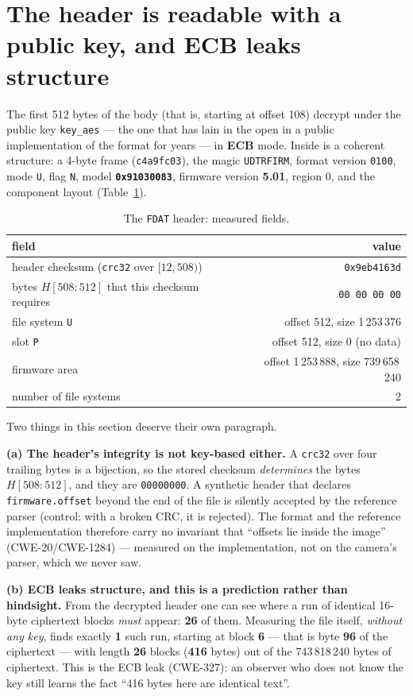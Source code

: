 \documentclass[12pt]{article}
\newcommand{\code}[1]{\texttt{\small #1}}
\newcommand{\hx}[1]{\texttt{\footnotesize #1}}
\begin{document}
\section{The header is readable with a public key, and ECB leaks structure}
\label{sec:header}

The first 512 bytes of the body (that is, starting at offset 108) decrypt under the public
key \code{key\_aes} --- the one that has lain in the open in a public implementation of the
format for years --- in \textbf{ECB} mode. Inside is a coherent structure: a 4-byte frame
(\hx{c4a9fc03}), the magic \code{UDTRFIRM}, format version \code{0100}, mode \code{U}, flag
\code{N}, model \textbf{\code{0x91030083}}, firmware version \textbf{5.01}, region 0, and the
component layout (Table~\ref{tab:header}).

\begin{table}[htbp]\centering
\small
\caption{The \code{FDAT} header: measured fields.}
\label{tab:header}
\begin{tabular}{lr}
\toprule
field & value \\
\midrule
header checksum (\code{crc32} over $[12,508)$) & \hx{0x9eb4163d} \\
bytes $H[508{:}512]$ that this checksum requires & \hx{00 00 00 00} \\
file system \code{U} & offset 512, size 1\,253\,376 \\
slot \code{P} & offset 512, size 0 (no data) \\
firmware area & offset 1\,253\,888, size 739\,658\,240 \\
number of file systems & 2 \\
\bottomrule
\end{tabular}
\end{table}

Two things in this section deserve their own paragraph.

\textbf{(a) The header's integrity is not key-based either.} A \code{crc32} over four trailing
bytes is a bijection, so the stored checksum \emph{determines} the bytes $H[508{:}512]$, and
they are \hx{00000000}. A synthetic header that declares \code{firmware.offset} beyond the end
of the file is silently accepted by the reference parser (control: with a broken CRC, it is
rejected). The format and the reference implementation therefore carry no invariant that
``offsets lie inside the image'' (CWE-20/CWE-1284) --- measured on the implementation, not on
the camera's parser, which we never saw.

\textbf{(b) ECB leaks structure, and this is a prediction rather than hindsight.} From the
decrypted header one can see where a run of identical 16-byte ciphertext blocks \emph{must}
appear: \textbf{26} of them. Measuring the file itself, \emph{without any key}, finds exactly
\textbf{1} such run, starting at block \textbf{6} --- that is byte \textbf{96} of the
ciphertext --- with length \textbf{26} blocks (\textbf{416} bytes) out of the
743\,818\,240 bytes of ciphertext. This is the ECB leak (CWE-327): an observer who does not
know the key still learns the fact ``416 bytes here are identical text''.
\end{document}
